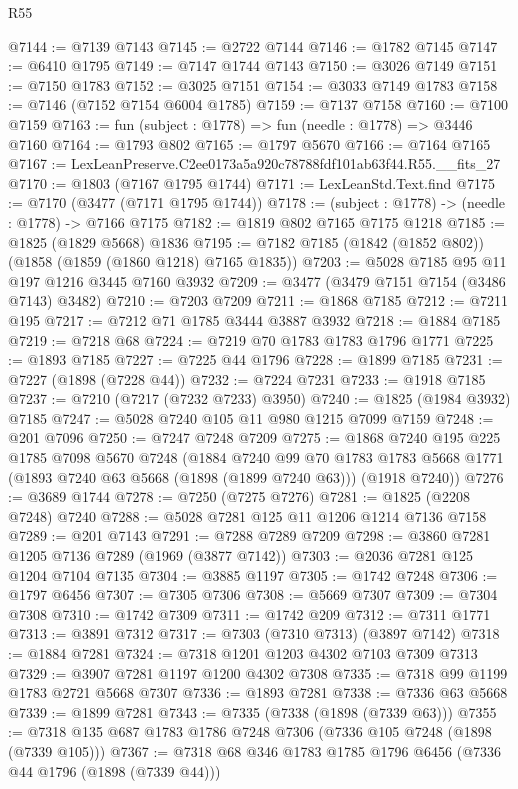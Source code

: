 \begin{lexlean}{R55}
\begin{coremodule}
@7144 := @7139 @7143
@7145 := @2722 @7144
@7146 := @1782 @7145
@7147 := @6410 @1795
@7149 := @7147 @1744 @7143
@7150 := @3026 @7149
@7151 := @7150 @1783
@7152 := @3025 @7151
@7154 := @3033 @7149 @1783
@7158 := @7146 (@7152 @7154 @6004 @1785)
@7159 := @7137 @7158
@7160 := @7100 @7159
@7163 := fun (subject : @1778) => fun (needle : @1778) => @3446 @7160
@7164 := @1793 @802
@7165 := @1797 @5670
@7166 := @7164 @7165
@7167 := LexLeanPreserve.C2ee0173a5a920c78788fdf101ab63f44.R55.__fits_27
@7170 := @1803 (@7167 @1795 @1744)
@7171 := LexLeanStd.Text.find
@7175 := @7170 (@3477 (@7171 @1795 @1744))
@7178 := (subject : @1778) -> (needle : @1778) -> @7166 @7175
@7182 := @1819 @802 @7165 @7175 @1218
@7185 := @1825 (@1829 @5668) @1836
@7195 := @7182 @7185 (@1842 (@1852 @802)) (@1858 (@1859 (@1860 @1218) @7165 @1835))
@7203 := @5028 @7185 @95 @11 @197 @1216 @3445 @7160 @3932
@7209 := @3477 (@3479 @7151 @7154 (@3486 @7143) @3482)
@7210 := @7203 @7209
@7211 := @1868 @7185
@7212 := @7211 @195
@7217 := @7212 @71 @1785 @3444 @3887 @3932
@7218 := @1884 @7185
@7219 := @7218 @68
@7224 := @7219 @70 @1783 @1783 @1796 @1771
@7225 := @1893 @7185
@7227 := @7225 @44 @1796
@7228 := @1899 @7185
@7231 := @7227 (@1898 (@7228 @44))
@7232 := @7224 @7231
@7233 := @1918 @7185
@7237 := @7210 (@7217 (@7232 @7233) @3950)
@7240 := @1825 (@1984 @3932) @7185
@7247 := @5028 @7240 @105 @11 @980 @1215 @7099 @7159
@7248 := @201 @7096
@7250 := @7247 @7248 @7209
@7275 := @1868
    @7240
    @195
    @225
    @1785
    @7098
    @5670
    @7248
    (@1884
      @7240
      @99
      @70
      @1783
      @1783
      @5668
      @1771
      (@1893 @7240 @63 @5668 (@1898 (@1899 @7240 @63)))
      (@1918 @7240))
@7276 := @3689 @1744
@7278 := @7250 (@7275 @7276)
@7281 := @1825 (@2208 @7248) @7240
@7288 := @5028 @7281 @125 @11 @1206 @1214 @7136 @7158
@7289 := @201 @7143
@7291 := @7288 @7289 @7209
@7298 := @3860 @7281 @1205 @7136 @7289 (@1969 (@3877 @7142))
@7303 := @2036 @7281 @125 @1204 @7104 @7135
@7304 := @3885 @1197
@7305 := @1742 @7248
@7306 := @1797 @6456
@7307 := @7305 @7306
@7308 := @5669 @7307
@7309 := @7304 @7308
@7310 := @1742 @7309
@7311 := @1742 @209
@7312 := @7311 @1771
@7313 := @3891 @7312
@7317 := @7303 (@7310 @7313) (@3897 @7142)
@7318 := @1884 @7281
@7324 := @7318 @1201 @1203 @4302 @7103 @7309 @7313
@7329 := @3907 @7281 @1197 @1200 @4302 @7308
@7335 := @7318 @99 @1199 @1783 @2721 @5668 @7307
@7336 := @1893 @7281
@7338 := @7336 @63 @5668
@7339 := @1899 @7281
@7343 := @7335 (@7338 (@1898 (@7339 @63)))
@7355 := @7318 @135 @687 @1783 @1786 @7248 @7306 (@7336 @105 @7248 (@1898 (@7339 @105)))
@7367 := @7318 @68 @346 @1783 @1785 @1796 @6456 (@7336 @44 @1796 (@1898 (@7339 @44)))

\end{coremodule}
\end{lexlean}
